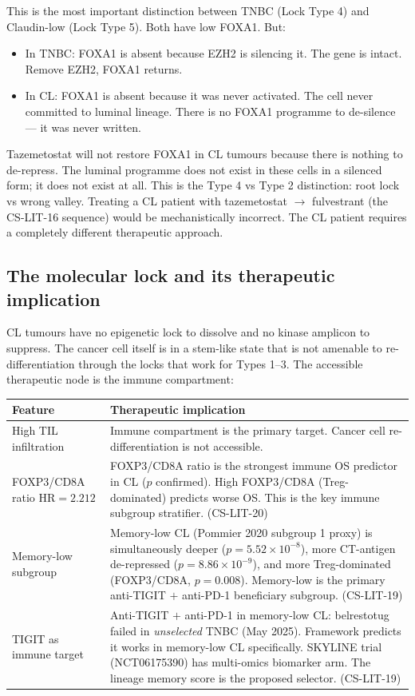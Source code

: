 \documentclass[12pt, a4paper]{article}
\begin{document}
This is the most important distinction between TNBC
(Lock Type 4) and Claudin-low (Lock Type 5). Both
have low FOXA1. But:

\begin{itemize}[noitemsep]
  \item In TNBC: FOXA1 is absent because EZH2 is
        silencing it. The gene is intact. Remove EZH2,
        FOXA1 returns.
  \item In CL: FOXA1 is absent because it was never
        activated. The cell never committed to luminal
        lineage. There is no FOXA1 programme to
        de-silence --- it was never written.
\end{itemize}

Tazemetostat will not restore FOXA1 in CL tumours
because there is nothing to de-repress. The luminal
programme does not exist in these cells in a silenced
form; it does not exist at all. This is the Type 4
vs Type 2 distinction: root lock vs wrong valley.
Treating a CL patient with tazemetostat $\rightarrow$
fulvestrant (the CS-LIT-16 sequence) would be
mechanistically incorrect. The CL patient requires
a completely different therapeutic approach.

\subsection{The molecular lock and its therapeutic
implication}

CL tumours have no epigenetic lock to dissolve and
no kinase amplicon to suppress. The cancer cell
itself is in a stem-like state that is not amenable
to re-differentiation through the locks that work
for Types 1--3. The accessible therapeutic node is
the immune compartment:

\begin{center}
\begin{tabular}{p{3.5cm}p{9cm}}
\toprule
\textbf{Feature} & \textbf{Therapeutic implication} \\
\midrule
High TIL infiltration
& Immune compartment is the primary target.
  Cancer cell re-differentiation is not accessible. \\[0.3em]
FOXP3/CD8A ratio
  HR$=2.212$
& FOXP3/CD8A ratio is the strongest immune OS
  predictor in CL ($p$ confirmed). High FOXP3/CD8A
  (Treg-dominated) predicts worse OS. This is the
  key immune subgroup stratifier. (CS-LIT-20) \\[0.3em]
Memory-low subgroup
& Memory-low CL (Pommier 2020 subgroup 1 proxy)
  is simultaneously deeper ($p=5.52\times10^{-8}$),
  more CT-antigen de-repressed ($p=8.86\times10^{-9}$),
  and more Treg-dominated (FOXP3/CD8A, $p=0.008$).
  Memory-low is the primary anti-TIGIT $+$ anti-PD-1
  beneficiary subgroup. (CS-LIT-19) \\[0.3em]
TIGIT as immune target
& Anti-TIGIT $+$ anti-PD-1 in memory-low CL:
  belrestotug failed in \textit{unselected} TNBC
  (May 2025). Framework predicts it works in
  memory-low CL specifically. SKYLINE trial
  (NCT06175390) has multi-omics biomarker arm.
  The lineage memory score is the proposed selector.
  (CS-LIT-19) \\
\bottomrule
\end{tabular}
\end{center}
\end{document}
